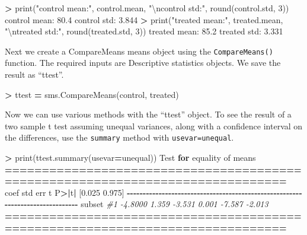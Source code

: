 \documentclass[
]{book}
\newenvironment{Shaded}{\begin{snugshade}}{\end{snugshade}}
\newcommand{\BuiltInTok}[1]{#1}
\newcommand{\CharTok}[1]{\textcolor[rgb]{0.31,0.60,0.02}{#1}}
\newcommand{\CommentTok}[1]{\textcolor[rgb]{0.56,0.35,0.01}{\textit{#1}}}
\newcommand{\ControlFlowTok}[1]{\textcolor[rgb]{0.13,0.29,0.53}{\textbf{#1}}}
\newcommand{\DecValTok}[1]{\textcolor[rgb]{0.00,0.00,0.81}{#1}}
\newcommand{\FloatTok}[1]{\textcolor[rgb]{0.00,0.00,0.81}{#1}}
\newcommand{\NormalTok}[1]{#1}
\newcommand{\OperatorTok}[1]{\textcolor[rgb]{0.81,0.36,0.00}{\textbf{#1}}}
\newcommand{\StringTok}[1]{\textcolor[rgb]{0.31,0.60,0.02}{#1}}
\begin{document}
\begin{Shaded}
\begin{Highlighting}[]
\OperatorTok{\textgreater{}} \BuiltInTok{print}\NormalTok{(}\StringTok{"control mean:"}\NormalTok{, control.mean, }\StringTok{"}\CharTok{\textbackslash{}n}\StringTok{control std:"}\NormalTok{, }\BuiltInTok{round}\NormalTok{(control.std, }\DecValTok{3}\NormalTok{))}
\NormalTok{control mean: }\FloatTok{80.4} 
\NormalTok{control std: }\FloatTok{3.844}
\OperatorTok{\textgreater{}} \BuiltInTok{print}\NormalTok{(}\StringTok{"treated mean:"}\NormalTok{, treated.mean, }\StringTok{"}\CharTok{\textbackslash{}n}\StringTok{treated std:"}\NormalTok{, }\BuiltInTok{round}\NormalTok{(treated.std, }\DecValTok{3}\NormalTok{))}
\NormalTok{treated mean: }\FloatTok{85.2} 
\NormalTok{treated std: }\FloatTok{3.331}
\end{Highlighting}
\end{Shaded}

Next we create a CompareMeans means object using the \texttt{CompareMeans()} function. The required inputs are Descriptive statistics objects. We save the result as ``ttest''.

\begin{Shaded}
\begin{Highlighting}[]
\OperatorTok{\textgreater{}}\NormalTok{ ttest }\OperatorTok{=}\NormalTok{ sms.CompareMeans(control, treated)}
\end{Highlighting}
\end{Shaded}

Now we can use various methods with the ``ttest'' object. To see the result of a two sample t test assuming unequal variances, along with a confidence interval on the differences, use the \texttt{summary} method with \texttt{usevar=\textquotesingle{}unequal\textquotesingle{}}.

\begin{Shaded}
\begin{Highlighting}[]
\OperatorTok{\textgreater{}} \BuiltInTok{print}\NormalTok{(ttest.summary(usevar}\OperatorTok{=}\StringTok{\textquotesingle{}unequal\textquotesingle{}}\NormalTok{))}
\NormalTok{                          Test }\ControlFlowTok{for}\NormalTok{ equality of means                          }
\OperatorTok{==============================================================================}
\NormalTok{                 coef    std err          t      P}\OperatorTok{\textgreater{}|}\NormalTok{t}\OperatorTok{|}\NormalTok{      [}\FloatTok{0.025}      \FloatTok{0.975}\NormalTok{]}
\OperatorTok{{-}{-}{-}{-}{-}{-}{-}{-}{-}{-}{-}{-}{-}{-}{-}{-}{-}{-}{-}{-}{-}{-}{-}{-}{-}{-}{-}{-}{-}{-}{-}{-}{-}{-}{-}{-}{-}{-}{-}{-}{-}{-}{-}{-}{-}{-}{-}{-}{-}{-}{-}{-}{-}{-}{-}{-}{-}{-}{-}{-}{-}{-}{-}{-}{-}{-}{-}{-}{-}{-}{-}{-}{-}{-}{-}{-}{-}{-}}
\NormalTok{subset }\CommentTok{\#1     {-}4.8000      1.359     {-}3.531      0.001      {-}7.587      {-}2.013}
\OperatorTok{==============================================================================}
\end{Highlighting}
\end{Shaded}
\end{document}
